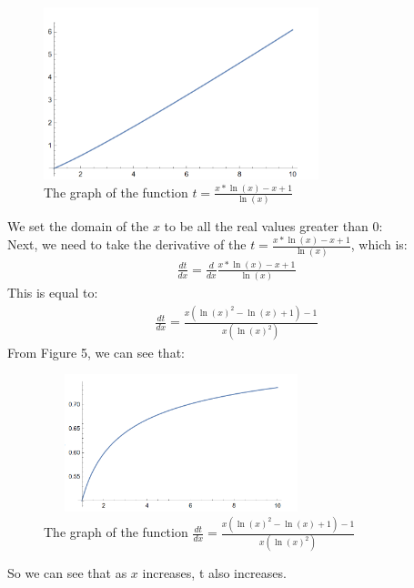 \documentclass{article}
\begin{document}
        \begin{figure}
        \centering
        \includegraphics[width=8cm, height=5cm]{302.png}
        \caption{The graph of the function $t = \frac{x * \ln(x) - x + 1}{\ln(x)}$}
        \end{figure}

        \newpage
        We set the domain of the $x$ to be all the real values greater than 0:\\
        Next, we need to take the derivative of the $t = \frac{x * \ln(x) - x + 1}{\ln(x)}$, which is:\\
            \begin{align*}
                \frac{dt}{dx} = \frac{d}{dx} \frac{x * \ln(x) - x + 1}{\ln(x)}
            \end{align*}
        This is equal to:\\
            \begin{align*}
                \frac{dt}{dx} = \frac{x(\ln(x) ^ 2 - \ln(x) + 1) - 1}{x(\ln(x) ^ 2)}
            \end{align*}
        From Figure 5, we can see that:\\
        
            
            \begin{figure}[h]
            \centering
            \includegraphics[width=8cm, height=4cm]{303.png}
            \caption{The graph of the function $\frac{dt}{dx} = \frac{x(\ln(x) ^ 2 - \ln(x) + 1) - 1}{x(\ln(x) ^ 2)}$}
            \end{figure}
        So we can see that as $x$ increases, t also increases.\\
\end{document}
